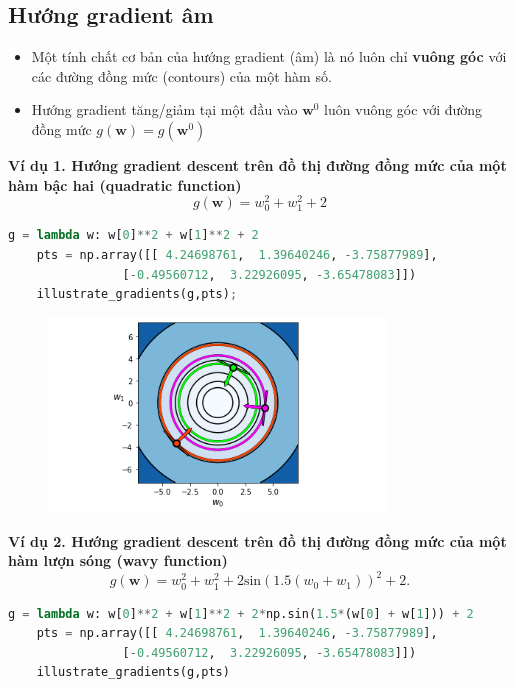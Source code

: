 \documentclass{book}
\begin{document}
\subsection{Hướng gradient âm}
\begin{itemize}
    \item Một tính chất cơ bản của hướng gradient (âm) là nó luôn chỉ \textbf{vuông góc} với các đường đồng mức (contours) của một hàm số.
    \item Hướng gradient tăng/giảm tại một đầu vào $\mathbf{w}^0$ luôn vuông góc với đường đồng mức $g(\mathbf{w})=g(\mathbf{w}^0)$
\end{itemize}
\textbf{Ví dụ 1. Hướng gradient descent trên đồ thị đường đồng mức của một hàm bậc hai (quadratic function)}
\begin{equation*}
    g\left(\mathbf{w}\right) = w_0^2 + w_1^2 + 2
\end{equation*}
\begin{lstlisting}[language=python]
    g = lambda w: w[0]**2 + w[1]**2 + 2
    pts = np.array([[ 4.24698761,  1.39640246, -3.75877989],
                [-0.49560712,  3.22926095, -3.65478083]])
    illustrate_gradients(g,pts);
\end{lstlisting}
\begin{figure}[H]
    \centering
    \includegraphics[width=0.8\textwidth]{images/gradient_descent_direction_quadratic_function.png}
\end{figure}
\textbf{Ví dụ 2. Hướng gradient descent trên đồ thị đường đồng mức của một hàm lượn sóng (wavy function)}
\begin{equation*}
    g\left(\mathbf{w}\right) = w_0^2 + w_1^2 + 2\text{sin}\left(1.5\left(w_0 + w_1\right)\right)^2 + 2.
\end{equation*}
\begin{lstlisting}[language=python]
    g = lambda w: w[0]**2 + w[1]**2 + 2*np.sin(1.5*(w[0] + w[1])) + 2
    pts = np.array([[ 4.24698761,  1.39640246, -3.75877989],
                [-0.49560712,  3.22926095, -3.65478083]])
    illustrate_gradients(g,pts)
\end{lstlisting}
\end{document}
